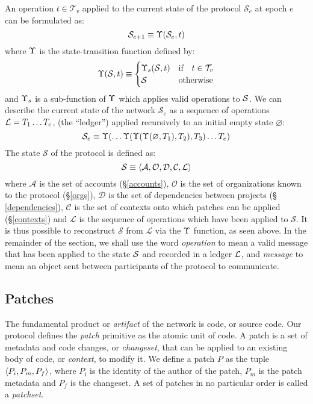 An operation $t \in \mathcal{T}_v$ applied to the current state of the protocol $\mathcal{S}_e$
at epoch $e$ can be formulated as:
\[
    \mathcal{S}_{e+1} \equiv \Upsilon(\mathcal{S}_e, t)
\]
where $\Upsilon$ is the state-transition function defined by:
\[
    \Upsilon(\mathcal{S}, t) \equiv \begin{cases}
        \Upsilon_{s}(\mathcal{S}, t) & \text{if} \quad t \in \mathcal{T}_v \\
        \mathcal{S}                & \text{otherwise}
    \end{cases}
\]
and $\Upsilon_s$ is a sub-function of $\Upsilon$ which applies valid operations to
$\mathcal{S}$.  We can describe the current
state of the network $\mathcal{S}_e$ as a sequence of operations $\mathcal{L} =
T_1 \dotso T_e$, (the ``ledger'') applied recursively to an initial empty
state $\varnothing$:
\[
    \mathcal{S}_e \equiv \Upsilon(\dotso \Upsilon(\Upsilon(\Upsilon(\varnothing,
    T_1), T_2), T_3) \dotso T_e)
\]
The state $\mathcal{S}$ of the protocol is defined as:
\[
    \mathcal{S} \equiv \langle \mathcal{A}, \mathcal{O}, \mathcal{D}, \mathcal{C}, \mathcal{L} \rangle \\
\]
where $\mathcal{A}$ is the set of accounts (\S \ref{accounts}), $\mathcal{O}$
is the set of organizations known to the protocol (\S \ref{orgs}),
$\mathcal{D}$ is the set of dependencies between projects (\S
\ref{dependencies}), $\mathcal{C}$ is the set of contexts onto which patches
can be applied (\S \ref{contexts}) and $\mathcal{L}$ is the sequence of
operations which have been applied to $\mathcal{S}$. It is thus possible to
reconstruct $\mathcal{S}$ from $\mathcal{L}$ via the $\Upsilon$ function, as
seen above. In the remainder of the section, we shall use the word
\emph{operation} to mean a valid message that has been applied to the state
$\mathcal{S}$ and recorded in a ledger $\mathcal{L}$, and \emph{message} to mean an
object sent between participants of the protocol to communicate.

\subsection{Patches}
\label{patches}

The fundamental product or \emph{artifact} of the \oscoin{} network is code, or
source code. Our protocol defines the \emph{patch} primitive as the atomic unit
of code. A patch is a set of metadata and code changes, or \emph{changeset},
that can be applied to an existing body of code, or \emph{context}, to modify
it. We define a patch $P$ as the tuple $\langle P_i, P_m, P_f \rangle$, where $P_i$ is
the identity of the author of the patch, $P_m$ is the patch metadata and $P_f$
is the changeset. A set of patches in no particular order is called a
\emph{patchset}.

